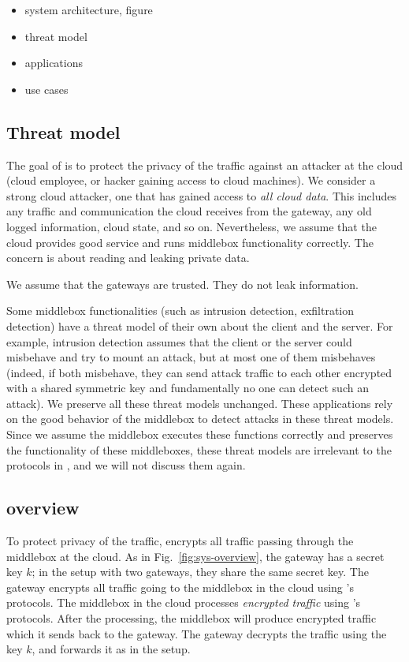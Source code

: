 \begin{itemize}
\item system architecture, figure
\item threat model
\item applications
\item use cases
\end{itemize}

\subsection{Threat model}

The goal of \sys is to protect the privacy of the traffic against an attacker at the cloud 
(cloud employee, or hacker gaining access to cloud machines). 
We consider a strong cloud attacker, one that has gained access to {\em all cloud data}.
This includes any traffic and communication the cloud receives from the 
gateway, any old logged information, cloud state, and so on. Nevertheless, we assume that 
the cloud provides good service and runs middlebox functionality correctly.  The concern is
about reading and leaking private data. 

We assume that the gateways are trusted. They do not leak information.


Some middlebox functionalities (such as intrusion detection, exfiltration detection) have a threat model
of their own about the client and the server. For example, intrusion detection assumes that 
the client or the server could misbehave and try to mount an attack, but at most one of them misbehaves 
(indeed, if both misbehave, they can send attack traffic to each other encrypted with a shared symmetric key and fundamentally
no one can detect such an attack).  We preserve all these threat models unchanged. These applications rely
on the good behavior of the middlebox to detect attacks in these threat models. Since we assume the middlebox executes
these functions correctly and \sys preserves the functionality of these middleboxes, 
these threat models are irrelevant to the protocols in \sys, and we will not discuss them again. 



\subsection{\sys overview}

To protect privacy of the traffic, \sys encrypts all traffic passing through the middlebox at the cloud. 
As in Fig.~\ref{fig:sys-overview}, the gateway has a secret key $k$; in the setup with two gateways, they share
the same secret key. The gateway encrypts all traffic going to the middlebox in the cloud using \sys's protocols.
The middlebox in the cloud processes {\em encrypted traffic} using \sys's protocols. 
After the processing, the middlebox
will produce encrypted traffic which it sends back to the gateway. The gateway decrypts the traffic using the key $k$, 
and forwards it as in the setup.

